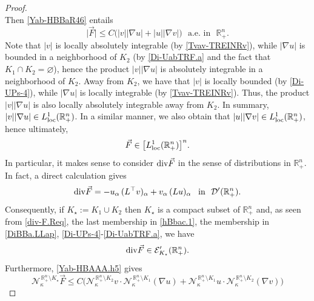 \documentclass[11pt,reqno]{amsart}
\numberwithin{equation}{section}
\theoremstyle{remark}
\begin{document}
\begin{proof}
\begin{equation}
\end{equation}
%
Then \eqref{Yab-HBBaR46} entails 
%
\begin{equation}\label{Yab-HBAAA.h5}
\big|\vec{F}\big|\leq C\big(|v||\nabla u|+|u|\big|\nabla v\big|\big)
\,\,\text{ a.e. in }\,\,{\mathbb{R}}^n_{+}.
\end{equation}
%
Note that $|v|$ is locally absolutely integrable (by \eqref{Tvav-TREINRv}), 
while $|\nabla u|$ is bounded in a neighborhood of $K_2$ (by \eqref{Di-UabTRF.a} 
and the fact that $K_1\cap K_2=\varnothing$), hence the product $|v||\nabla u|$ is 
absolutely integrable in a neighborhood of $K_2$. Away from $K_2$, we have that 
$|v|$ is locally bounded (by \eqref{Di-UPs-4}), while $|\nabla u|$ is locally 
integrable (by \eqref{Tvav-TREINRv}). Thus, the product $|v||\nabla u|$ is also 
locally absolutely integrable away from $K_2$. In summary, 
$|v||\nabla u|\in L^1_{\rm loc}({\mathbb{R}}^n_{+})$. In a similar manner, we also 
obtain that $|u||\nabla v|\in L^1_{\rm loc}({\mathbb{R}}^n_{+})$, 
hence ultimately, 
%
\begin{equation}\label{Yab-HBAAA.aF}
\vec{F}\in\big[L^1_{\rm loc}({\mathbb{R}}^n_{+})\big]^n.
\end{equation}
%
In particular, it makes sense to consider ${\rm div}\vec{F}$ in the sense of 
distributions in ${\mathbb{R}}^n_{+}$. In fact, a direct calculation gives
%
\begin{equation}\label{div-F.Req}
{\rm div}\vec{F}=-u_{\alpha}\,(L^{\top}v)_\alpha+v_{\alpha}\,(Lu)_\alpha
\,\,\,\text{ in }\,\,{\mathcal{D}}'({\mathbb{R}}^n_{+}).
\end{equation}
%
Consequently, if $K_\star:=K_1\cup K_2$ then $K_\star$ is a compact 
subset of ${\mathbb{R}}^n_{+}$ and, as seen from \eqref{div-F.Req}, the last membership in \eqref{hBbac.1},
the membership in \eqref{DiBBa.LLap}, \eqref{Di-UPs-4}-\eqref{Di-UabTRF.a}, we have
%
\begin{equation}\label{div-F.Req.3}
{\rm div}\vec{F}\in{\mathcal{E}}'_{K_\star}({\mathbb{R}}^n_{+}). 
\end{equation}
%
Furthermore, \eqref{Yab-HBAAA.h5} gives
%
\begin{equation}\label{Yab-HBna-TAn}
{\mathcal{N}}^{\,\mathbb{R}^{n}_{+}\setminus K_\star}_{\kappa}\vec{F}
\leq C\Big({\mathcal{N}}^{\,\mathbb{R}^{n}_{+}\setminus K_2}_{\kappa}v\cdot
{\mathcal{N}}^{\,\mathbb{R}^{n}_{+}\setminus K_1}_{\kappa}(\nabla u) 
+{\mathcal{N}}^{\,\mathbb{R}^{n}_{+}\setminus K_1}_{\kappa}u
\cdot{\mathcal{N}}^{\,\mathbb{R}^{n}_{+}\setminus K_2}_{\kappa}(\nabla v)\Big)

\end{equation}
\end{proof}
\end{document}
